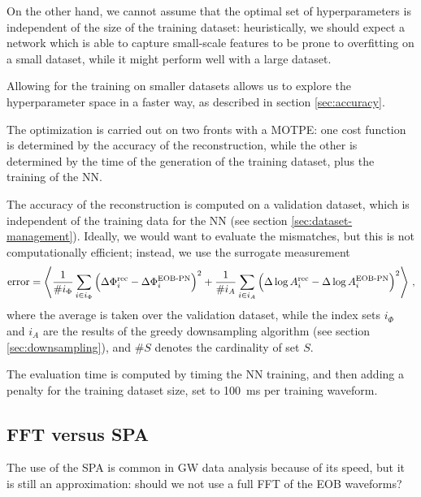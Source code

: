 \documentclass[main.tex]{subfiles}
\begin{document}
On the other hand, we cannot assume that the optimal set of hyperparameters is independent of the size of the training dataset: heuristically, we should expect a network which is able to capture small-scale features to be prone to overfitting on a small dataset, while it might perform well with a large dataset. 

Allowing for the training on smaller datasets allows us to explore the hyperparameter space in a faster way, as described in section \ref{sec:accuracy}.

The optimization is carried out on two fronts with a \ac{MOTPE}: one cost function is determined by the accuracy of the reconstruction, while the other is determined by the time of the generation of the training dataset, plus the training of the \ac{NN}. 

The accuracy of the reconstruction is computed on a validation dataset, which is independent of the training data for the \ac{NN} (see section \ref{sec:dataset-management}). 
Ideally, we would want to evaluate the mismatches, but this is not computationally efficient; instead, we use the surrogate measurement 
%
\begin{align}
\text{error} =\expval{ \frac{1}{\# i_\Phi } \sum _{i \in i_\Phi } \qty(\Delta \Phi ^{\text{rec}}_i - \Delta \Phi ^{\text{EOB-PN}}_i )^2 + \frac{1}{\# i_A} \sum _{i \in i_A} \qty(\Delta \log A ^{\text{rec}}_i - \Delta \log A ^{\text{EOB-PN}}_i)^2}
\,,
\end{align}
%
where the average is taken over the validation dataset, while the index sets \(i_\Phi \) and \(i_A\) are the results of the greedy downsampling algorithm (see section \ref{sec:downsampling}), and \(\# S\) denotes the cardinality of set \(S\). 

The evaluation time is computed by timing the \ac{NN} training, and then adding a penalty for the training dataset size, set to \SI{100}{ms} per training waveform. 


\subsection{FFT versus SPA}

The use of the \ac{SPA} is common in \ac{GW} data analysis because of its speed, but it is still an approximation: should we not use a full \ac{FFT} of the \ac{EOB} waveforms? 
\end{document}
